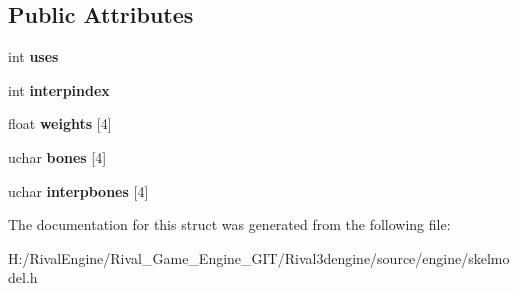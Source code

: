\subsection*{Public Attributes}
\begin{DoxyCompactItemize}
\item 
\mbox{\label{structskelmodel_1_1blendcombo_ac4e97850417feaa328277c3535fcb58e}} 
int {\bfseries uses}
\item 
\mbox{\label{structskelmodel_1_1blendcombo_a7a92c3fcff480eb62aae93a38f3afd1f}} 
int {\bfseries interpindex}
\item 
\mbox{\label{structskelmodel_1_1blendcombo_aca020de4c86cca6008ea0cc52c7b89f4}} 
float {\bfseries weights} \mbox{[}4\mbox{]}
\item 
\mbox{\label{structskelmodel_1_1blendcombo_af05ad0da556e0c9ea45ef6b74748ee20}} 
uchar {\bfseries bones} \mbox{[}4\mbox{]}
\item 
\mbox{\label{structskelmodel_1_1blendcombo_a87ead1cb42a59f214417e13697f33552}} 
uchar {\bfseries interpbones} \mbox{[}4\mbox{]}
\end{DoxyCompactItemize}


The documentation for this struct was generated from the following file\+:\begin{DoxyCompactItemize}
\item 
H\+:/\+Rival\+Engine/\+Rival\+\_\+\+Game\+\_\+\+Engine\+\_\+\+G\+I\+T/\+Rival3dengine/source/engine/skelmodel.\+h\end{DoxyCompactItemize}
